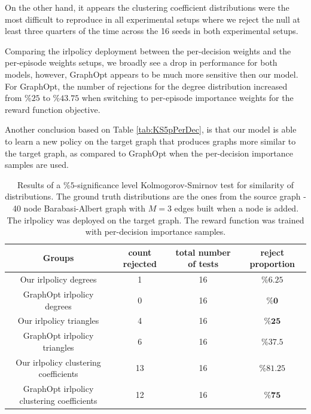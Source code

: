 \documentclass{report}
\numberwithin{equation}{section}
\numberwithin{figure}{section}
\numberwithin{table}{section}
\numberwithin{algorithm}{section}
\begin{document}
On the other hand, 
it appears the clustering coefficient distributions were the most 
difficult to reproduce in all experimental setups where we reject 
the null at least three quarters of the time across the 16 seeds 
in both experimental setups.

Comparing the irlpolicy deployment between the per-decision 
weights and the per-episode weights setups, we broadly see 
a drop in performance for both models, however, GraphOpt 
appears to be much more sensitive then our model. For GraphOpt,
the 
number of rejections for the degree distribution increased 
from $\%25$ to $\%43.75$ when switching to per-episode 
importance weights for the reward function objective.

Another conclusion based on Table \ref{tab:KS5pPerDec}, is that 
our model is able to learn a new policy on the target graph that 
produces graphs more similar to the target graph, as compared to 
GraphOpt when the per-decision importance samples are used.

\begin{table}[!h]
  \begin{center}
    \caption{\label{tab:KS5pPerDec3} 
    Results of a $\%5$-significance level 
    Kolmogorov-Smirnov 
    test for similarity of distributions. 
    The ground truth distributions are the ones 
    from the source graph - 40 node Barabasi-Albert graph 
    with $M=3$ edges built when a node is added. The irlpolicy 
    was deployed on the target graph. The reward 
    function was trained with per-decision importance samples.}
    \begin{tabular}{|c|c|c|c|}
      \hline
      \textbf{Groups} & \textbf{count rejected} & \textbf{total number of tests} & \textbf{reject proportion}\\
      \hline
      Our irlpolicy degrees & 1 & 16 & $\%6.25$\\
      GraphOpt irlpolicy degrees & 0 & 16 & $\%\textbf{0}$\\
      \hline
      Our irlpolicy triangles & 4 & 16 & $\%\textbf{25}$\\
      GraphOpt irlpolicy triangles & 6 & 16 & $\%37.5$\\
      \hline
      Our irlpolicy clustering coefficients & 13 & 16 & $\%81.25$\\
      GraphOpt irlpolicy clustering coefficients & 12 & 16 & $\%\textbf{75}$\\
      \hline
    \end{tabular}
  \end{center}
\end{table}
\end{document}
